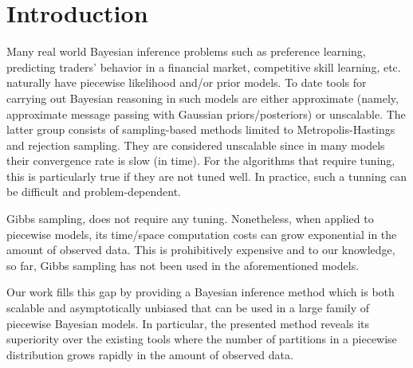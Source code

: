\section{Introduction}

Many real world Bayesian inference problems such as preference learning, predicting traders’ behavior in a financial market, competitive skill learning, etc. naturally have piecewise likelihood and/or prior models. To date tools for carrying out Bayesian reasoning in such models are either approximate (namely, approximate message passing with Gaussian priors/posteriors) or unscalable. The latter group consists of sampling-based methods limited to Metropolis-Hastings and rejection sampling. They are considered unscalable since in many models their convergence rate is slow (in time). 
For the algorithms that require tuning, this is particularly true if they are not tuned well.
In practice, such a tunning can be difficult and problem-dependent. 

Gibbs sampling, does not require any tuning.  
Nonetheless, when applied to piecewise models, its time/space computation costs can grow exponential in the amount of observed data.    
This is prohibitively expensive and to our knowledge, so far, Gibbs sampling has not been used in the aforementioned models. 

Our work fills this gap by providing a Bayesian inference method which is both scalable and asymptotically unbiased that can be used in a large family of piecewise Bayesian models. 
In particular, the presented method reveals its superiority over the existing tools where the number of partitions in a piecewise distribution grows rapidly in the amount of observed data.

